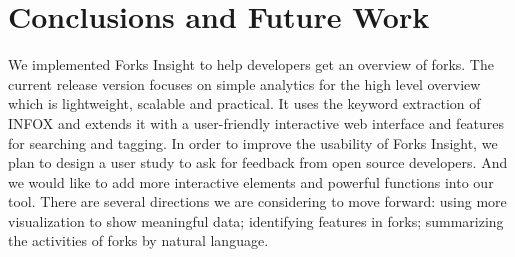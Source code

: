 \section{Conclusions and Future Work}
We implemented Forks Insight to help developers get an overview of forks. The current release version focuses on simple analytics for the high level overview which is lightweight, scalable and practical. It uses the keyword extraction of INFOX and extends it with a user-friendly interactive web interface and features for searching and tagging. In order to improve the usability of Forks Insight, we plan to design a user study to ask for feedback from open source developers. And we would like to add more interactive elements and powerful functions into our tool. There are several directions we are considering to move forward: using more visualization to show meaningful data; identifying features in forks; summarizing the activities of forks by natural language.

\iffalse
\begin{acks}
  TODO
\end{acks}
\fi
